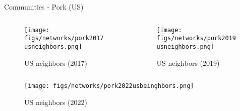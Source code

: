 \documentclass[10pt,xcolor={dvipsnames}]{beamer}
\begin{document}
\begin{frame}{Communities - Pork (US)}

\begin{columns}[onlytextwidth]
    \begin{column}{.5\textwidth}
        \begin{minipage}[t][.5\textheight][t]{\textwidth}
            \begin{figure}
                \caption*{\tiny US neighbors (2017)}
                \texttt{[image: figs/networks/pork2017usneighbors.png]}
            \end{figure}
        \end{minipage}
    \end{column}
\hfill
    \begin{column}{.5\textwidth}
        \begin{minipage}[t][.5\textheight][t]{\textwidth}
            \begin{figure}
                \caption*{\tiny US neighbors (2019)}
                \texttt{[image: figs/networks/pork2019usneighbors.png]}\\
            \end{figure}
        \end{minipage}
    \end{column}
\end{columns}
\vspace{-35pt}
\begin{figure}
    \centering
    \caption*{\tiny US neighbors (2022)}
    \texttt{[image: figs/networks/pork2022usbeinghbors.png]}    
\end{figure}

\end{frame}
\end{document}
